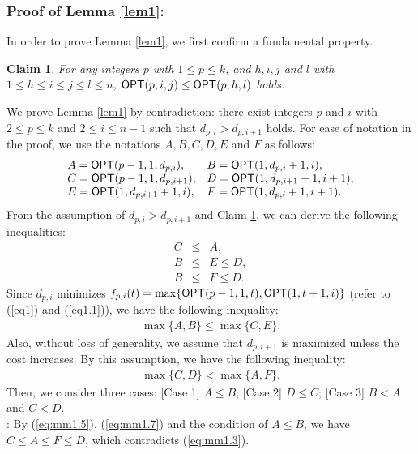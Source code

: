 \documentclass[a4paper]{llncs}
\newtheorem{clm}{Claim}
\begin{document}
\subsubsection{Proof of Lemma \ref{lem1}:}
In order to prove Lemma \ref{lem1}, we first confirm a fundamental property.
\begin{clm}
For any integers $p$ with $1 \le p \le k$, and $h, i, j$ and $l$ with $1 \le h \le i \le j \le l \le n$,
${\sf OPT}(p, i, j) \le {\sf OPT}(p, h, l)$ holds.
\label{clm:mm1.1}
\end{clm}
We prove Lemma \ref{lem1} by contradiction: 
there exist integers $p$ and $i$ with $2 \le p \le k$ and $2 \le i \le n-1$ such that
$d_{p, i} > d_{p, i+1}$ holds.
For ease of notation in the proof, we use the notations $A, B, C, D, E$ and $F$ as follows:
\begin{eqnarray}
\begin{array}{ll}
A = {\sf OPT}(p-1, 1, d_{p, i}),		&	B = {\sf OPT}(1, d_{p, i}+1, i), \\
C = {\sf OPT}(p-1, 1, d_{p, i+1}),	&	D = {\sf OPT}(1, d_{p, i+1}+1, i+1), \\
E = {\sf OPT}(1, d_{p, i+1}+1, i),	&	F = {\sf OPT}(1, d_{p, i}+1, i+1).
\end{array}
\label{eq:mm1.1}
\end{eqnarray}
From the assumption of $d_{p, i} > d_{p, i+1}$ and Claim \ref{clm:mm1.1}, we can derive the following inequalities:
\begin{eqnarray}
C &\le& A, \label{eq:mm1.5} \\
B &\le& E \le D, \label{eq:mm1.6} \\
B &\le& F \le D. \label{eq:mm1.7}
\end{eqnarray}
Since $d_{p, i}$ minimizes $f_{p, i}(t) = \max \{ {\sf OPT}(p-1, 1, t), {\sf OPT}(1, t+1, i) \}$ (refer to (\ref{eq1}) and (\ref{eq1.1})),
we have the following inequality:
\begin{eqnarray}
\max \{A, B \} \le \max \{ C, E \}.
\label{eq:mm1.2}
\end{eqnarray}
Also, without loss of generality, we assume that $d_{p, i+1}$ is maximized unless the cost increases. 
By this assumption, we have the following inequality:
\begin{eqnarray}
\max \{C, D \} < \max \{ A, F \}.
\label{eq:mm1.3}
\end{eqnarray}
Then, we consider three cases:
[Case 1] $A \le B$; [Case 2] $D \le C$; [Case 3] $B < A$ and $C < D$. \\
\noindent
[Case 1]: By (\ref{eq:mm1.5}), (\ref{eq:mm1.7}) and the condition of $A \le B$, we have $C \le A \le F \le D$, which contradicts (\ref{eq:mm1.3}).\\
\end{document}
